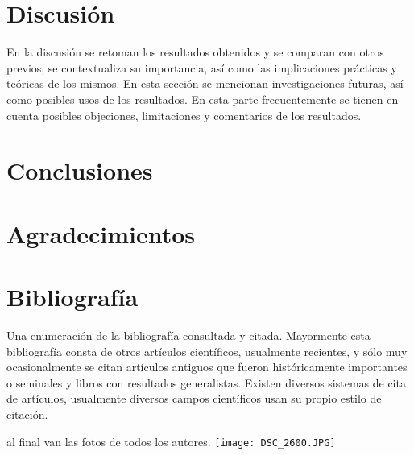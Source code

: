 \documentclass[10pt,letterpaper]{article}
\begin{document}
\begin{multicols}{2}
\section{Discusión}
En la discusión se retoman los resultados obtenidos y se comparan con otros previos, se contextualiza su importancia, así como las implicaciones prácticas y teóricas de los mismos. En esta sección se mencionan investigaciones futuras, así como posibles usos de los resultados. En esta parte frecuentemente se tienen en cuenta posibles objeciones, limitaciones y comentarios de los resultados.

\section{Conclusiones}

\section{Agradecimientos}

\section{Bibliografía}
Una enumeración de la bibliografía consultada y citada. Mayormente esta bibliografía consta de otros artículos científicos, usualmente recientes, y sólo muy ocasionalmente se citan artículos antiguos que fueron históricamente importantes o seminales y libros con resultados generalistas. Existen diversos sistemas de cita de artículos, usualmente diversos campos científicos usan su propio estilo de citación.

\begin{thebibliography}{99}
\end{thebibliography}

al final van las fotos de todos los autores.
\texttt{[image: DSC\_2600.JPG]} 


\end{multicols}
\end{document}
